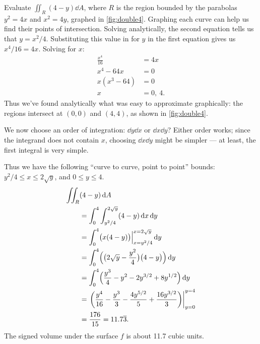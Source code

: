 \begin{example}\label{ex_double4}%
Evaluate $\iint_R (4-y)\dd A$, where $R$ is the region bounded by the parabolas $y^2=4x$ and $x^2=4y$, graphed in \autoref{fig:double4}.
%
%
\solution
Graphing each curve can help us find their points of intersection. Solving analytically, the second equation tells us that $y=x^2/4$. Substituting this value in for $y$ in the first equation gives us $x^4/16 = 4x$. Solving for $x$:
\begin{align*}
\frac{x^4}{16} &= 4x\\
x^4-64x &=0\\
x(x^3-64) &=0\\
x&= 0,\ 4.
\end{align*}
Thus we've found analytically what was easy to approximate graphically: the regions intersect at $(0,0)$ and $(4,4)$, as shown in \autoref{fig:double4}. 

We now choose an order of integration: $\dd y\dd x$ or $\dd x\dd y$? Either order works; since the integrand does not contain $x$, choosing $\dd x\dd y$ might be simpler --- at least, the first integral is very simple.

Thus we have the following ``curve to curve, point to point'' bounds: $y^2/4\leq x\leq 2\sqrt y$, and $0\leq y\leq 4$. 
\begin{align*}
\iint_R &(4-y)\operatorname{d}\! A \\
	&= \int_0^4\int_{y^2/4}^{2\sqrt{y}}(4-y)\operatorname{d}\! x\operatorname{d}\! y\\
	&= \int_0^4 \bigl(x(4-y)\bigr)\Big|_{x=y^2/4}^{x=2\sqrt{y}}\operatorname{d}\! y\\
	&= \int_0^4 \Bigl(\bigl(2\sqrt{y}-\frac{y^2}{4}\bigr)\bigl(4-y\bigr)\Bigr)\operatorname{d}\! y\\
	&= \int_0^4 \Bigl( \frac{y^3}{4}-y^2-2y^{3/2}+8y^{1/2}\Bigr)\operatorname{d}\! y\\
	&= \left.\left(\frac{y^4}{16}-\frac{y^3}{3}-\frac{4y^{5/2}}5+\frac{16y^{3/2}}3\right)\right|_{y=0}^{y=4}\\
	&= \frac{176}{15} = 11.7\overline{3}.
\end{align*}
The signed volume under the surface $f$ is about 11.7 cubic units.
\end{example}

